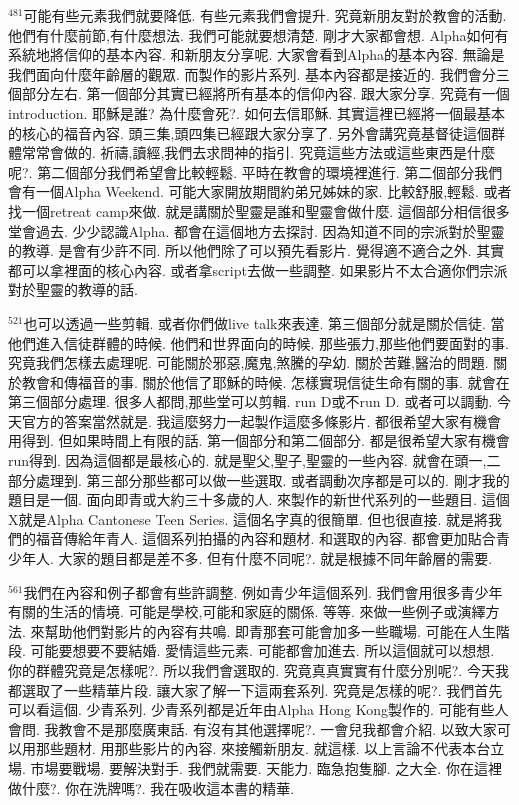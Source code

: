 \documentclass{book}
\begin{document}
$^{481}$可能有些元素我們就要降低.
有些元素我們會提升.
究竟新朋友對於教會的活動.
他們有什麼前節,有什麼想法.
我們可能就要想清楚.
剛才大家都會想.
Alpha如何有系統地將信仰的基本內容.
和新朋友分享呢.
大家會看到Alpha的基本內容.
無論是我們面向什麼年齡層的觀眾.
而製作的影片系列.
基本內容都是接近的.
我們會分三個部分左右.
第一個部分其實已經將所有基本的信仰內容.
跟大家分享.
究竟有一個introduction.
耶穌是誰? 為什麼會死?.
如何去信耶穌.
其實這裡已經將一個最基本的核心的福音內容.
頭三集,頭四集已經跟大家分享了.
另外會講究竟基督徒這個群體常常會做的.
祈禱,讀經,我們去求問神的指引.
究竟這些方法或這些東西是什麼呢?.
第二個部分我們希望會比較輕鬆.
平時在教會的環境裡進行.
第二個部分我們會有一個Alpha Weekend.
可能大家開放期間約弟兄姊妹的家.
比較舒服,輕鬆.
或者找一個retreat camp來做.
就是講關於聖靈是誰和聖靈會做什麼.
這個部分相信很多堂會過去.
少少認識Alpha.
都會在這個地方去探討.
因為知道不同的宗派對於聖靈的教導.
是會有少許不同.
所以他們除了可以預先看影片.
覺得適不適合之外.
其實都可以拿裡面的核心內容.
或者拿script去做一些調整.
如果影片不太合適你們宗派對於聖靈的教導的話.

$^{521}$也可以透過一些剪輯.
或者你們做live talk來表達.
第三個部分就是關於信徒.
當他們進入信徒群體的時候.
他們和世界面向的時候.
那些張力,那些他們要面對的事.
究竟我們怎樣去處理呢.
可能關於邪惡,魔鬼,煞騰的孕幼.
關於苦難,醫治的問題.
關於教會和傳福音的事.
關於他信了耶穌的時候.
怎樣實現信徒生命有關的事.
就會在第三個部分處理.
很多人都問,那些堂可以剪輯.
run D或不run D.
或者可以調動.
今天官方的答案當然就是.
我這麼努力一起製作這麼多條影片.
都很希望大家有機會用得到.
但如果時間上有限的話.
第一個部分和第二個部分.
都是很希望大家有機會run得到.
因為這個都是最核心的.
就是聖父,聖子,聖靈的一些內容.
就會在頭一,二部分處理到.
第三部分那些都可以做一些選取.
或者調動次序都是可以的.
剛才我的題目是一個.
面向即青或大約三十多歲的人.
來製作的新世代系列的一些題目.
這個X就是Alpha Cantonese Teen Series.
這個名字真的很簡單.
但也很直接.
就是將我們的福音傳給年青人.
這個系列拍攝的內容和題材.
和選取的內容.
都會更加貼合青少年人.
大家的題目都是差不多.
但有什麼不同呢?.
就是根據不同年齡層的需要.

$^{561}$我們在內容和例子都會有些許調整.
例如青少年這個系列.
我們會用很多青少年有關的生活的情境.
可能是學校,可能和家庭的關係.
等等.
來做一些例子或演繹方法.
來幫助他們對影片的內容有共鳴.
即青那套可能會加多一些職場.
可能在人生階段.
可能要想要不要結婚.
愛情這些元素.
可能都會加進去.
所以這個就可以想想.
你的群體究竟是怎樣呢?.
所以我們會選取的.
究竟真真實實有什麼分別呢?.
今天我都選取了一些精華片段.
讓大家了解一下這兩套系列.
究竟是怎樣的呢?.
我們首先可以看這個.
少青系列.
少青系列都是近年由Alpha Hong Kong製作的.
可能有些人會問.
我教會不是那麼廣東話.
有沒有其他選擇呢?.
一會兒我都會介紹.
以致大家可以用那些題材.
用那些影片的內容.
來接觸新朋友.
就這樣.
以上言論不代表本台立場.
市場要戰場.
要解決對手.
我們就需要.
天能力.
臨急抱隻腳.
之大全.
你在這裡做什麼?.
你在洗牌嗎?.
我在吸收這本書的精華.
\end{document}
